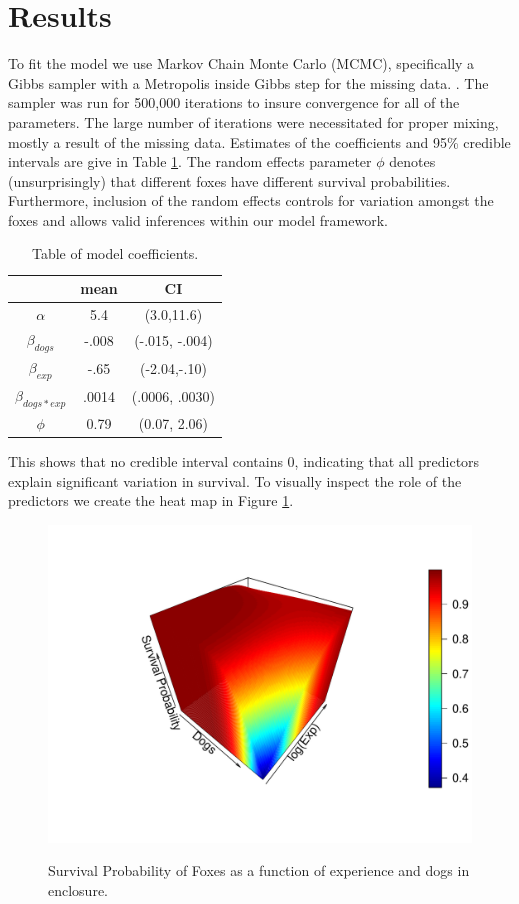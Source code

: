 \documentclass[aoas,preprint]{imsart}
\numberwithin{equation}{section}
\theoremstyle{plain}
\begin{document}
\section{Results}
To fit the model we use Markov Chain Monte Carlo (MCMC), specifically a Gibbs sampler with a Metropolis inside Gibbs step for the missing data. . The sampler was run for 500,000 iterations to insure convergence for all of the parameters. The large number of iterations were necessitated for proper mixing, mostly a result of the missing data. Estimates of the coefficients and 95\% credible intervals are give in Table \ref{tab:PostEst}. The random effects parameter $\phi$ denotes (unsurprisingly) that different foxes have different survival probabilities. Furthermore, inclusion of the random effects controls for variation amongst the foxes and allows valid inferences within our model framework.
\begin{table}[h!]
	\begin{center}
		\begin{tabular}{|c|c|c|}
			\hline
			& mean & CI \\
			\hline
			$\alpha$ & 5.4 & (3.0,11.6) \\
			$\beta_{dogs}$ & -.008 & (-.015, -.004) \\
			$\beta_{exp}$ & -.65 & (-2.04,-.10) \\
			$\beta_{dogs*exp}$ & .0014 & (.0006, .0030)\\
			$ \phi$ & 0.79 & (0.07, 2.06) \\
			\hline
		\end{tabular}
		\label{tab:PostEst}
	\end{center}
	\caption{Table of model coefficients.}
\end{table}
 This shows that no credible interval contains 0, indicating that all predictors explain significant variation in survival. To visually inspect the role of the predictors we create the heat map in Figure \ref{fig:SurvProb2}.
\begin{figure}[h!]
\begin{center}
\caption{Survival Probability of Foxes as a function of experience and dogs in enclosure.}
\includegraphics[width=1\textwidth]{survivalprob.pdf}
\label{fig:SurvProb2}
\end{center}
\end{figure}
\end{document}
